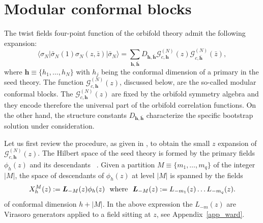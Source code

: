 \documentclass[a4paper,11pt]{article}
\begin{document}
\section{Modular conformal blocks}\label{sec:conf_blocks}
The twist fields four-point 
function of the orbifold theory admit the following expansion:
\begin{equation}\label{conformal_block_decomposition_0}
 \langle \sigma_N | \bar{\sigma}_N(1) \sigma_N (z, \bar{z})|\bar{\sigma}_N\rangle=
 \sum_{\boldsymbol{h},\boldsymbol{\bar{h}}} D_{\boldsymbol{h}, \boldsymbol{\bar{h}}}
 \mathcal{G}_{c, \boldsymbol{h}}^{(N)}(z)\mathcal{G}_{c,\boldsymbol{\bar{h}}}^{(N)}(\bar{z}),
\end{equation}
where $\boldsymbol{h}\equiv\{h_1, \dots, h_N\}$ with $h_j$ being the conformal dimension of  
a primary in the seed theory. 
The function $\mathcal{G}_{c, \boldsymbol{h}}^{(N)}(z)$, discussed below, are the so-called modular conformal blocks. The $\mathcal{G}_{c, \boldsymbol{h}}^{(N)}(z)$ are fixed by the orbifold symmetry algebra  and they encode therefore the universal part of the orbifold correlation functions. On the other hand, the structure constants  $D_{\boldsymbol{h}, \boldsymbol{\bar{h}}}$  characterize the specific bootstrap solution under consideration. 

\noindent Let us first review the procedure, as  given in \cite{Collier}, to obtain the small $z$ expansion  of  $\mathcal{G}_{c, \boldsymbol{h}}^{(N)}(z)$.  The Hilbert space of the seed theory is formed by the primary fields $\phi_{h}(z)$  and its descendants ~\cite{BPZ}. Given a partition  $M\equiv\{m_1,\dots,m_q\}$ of the integer  $|M|$, the space of descendants of $\phi_{h}(z)$ at level $|M|$ is spanned by the fields
\begin{equation}
\label{desc}
 X_{h}^{M}(z):=\boldsymbol{L}_{-M}(z)\phi_h(z)~~{\rm{where}}~~ \boldsymbol{L}_{-M}(z):=L_{-m_1}(z)\dots L_{-m_q}(z).
 \end{equation}
 of conformal dimension $h+|M|$. In the above expression the  $L_{-m}(z)$ are Virasoro generators applied to a field sitting at $z$, see Appendix~\ref{app_ward}.   
 
\end{document}
